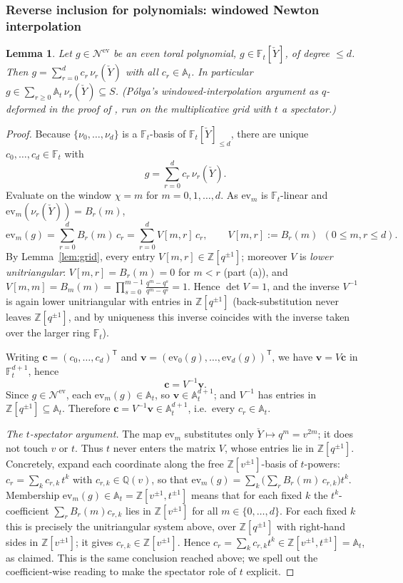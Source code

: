 \documentclass[11pt]{article}
\newtheorem{lemma}{Lemma}
\newcommand{\At}{\mathbb{A}_t}
\newcommand{\Ft}{\mathbb{F}_t}
\newcommand{\Nev}{\mathcal N^{\mathrm{ev}}}
\newcommand{\Yc}{\check Y}
\newcommand{\Z}{\mathbb Z}
\newcommand{\ev}{\mathrm{ev}}
\begin{document}
\subsubsection{Reverse inclusion for polynomials: windowed Newton interpolation}

\begin{lemma}\label{lem:rev}
Let $g\in\Nev$ be an even toral \emph{polynomial}, $g\in\Ft[\Yc]$, of degree
$\le d$. Then $g=\sum_{r=0}^{d}c_r\,\nu_r(\Yc)$ with all $c_r\in\At$. In
particular $g\in\sum_{r\ge0}\At\,\nu_r(\Yc)\subseteq S$.
(P\'olya's windowed-interpolation argument as $q$-deformed in the proof of
\cite[\S1]{HarmanHopkins}, run on the multiplicative grid with $t$ a
spectator.)
\end{lemma}

\begin{proof}
Because $\{\nu_0,\dots,\nu_d\}$ is a $\Ft$-basis of $\Ft[\Yc]_{\le d}$, there are
unique $c_0,\dots,c_d\in\Ft$ with
\[
  g=\sum_{r=0}^{d}c_r\,\nu_r(\Yc).
\]
Evaluate on the window $\chi=m$ for $m=0,1,\dots,d$. As $\ev_m$ is
$\Ft$-linear and $\ev_m(\nu_r(\Yc))=B_r(m)$,
\[
  \ev_m(g)=\sum_{r=0}^{d}B_r(m)\,c_r
  =\sum_{r=0}^{d}V[m,r]\,c_r,
  \qquad V[m,r]:=B_r(m)\ \ (0\le m,r\le d).
\]
By Lemma~\ref{lem:grid}, every entry $V[m,r]\in\Z[q^{\pm1}]$; moreover $V$ is
\emph{lower unitriangular}: $V[m,r]=B_r(m)=0$ for $m<r$ (part (a)), and
$V[m,m]=B_m(m)=\prod_{s=0}^{m-1}\frac{q^{m}-q^{s}}{q^{m}-q^{s}}=1$. Hence
$\det V=1$, and the inverse $V^{-1}$ is again lower unitriangular with entries in
$\Z[q^{\pm1}]$ (back-substitution never leaves $\Z[q^{\pm1}]$, and by uniqueness
this inverse coincides with the inverse taken over the larger ring $\Ft$).

Writing $\mathbf c=(c_0,\dots,c_d)^{\mathsf T}$ and
$\mathbf v=(\ev_0(g),\dots,\ev_d(g))^{\mathsf T}$, we have $\mathbf v=V\mathbf c$
in $\Ft^{d+1}$, hence
\[
  \mathbf c=V^{-1}\mathbf v .
\]
Since $g\in\Nev$, each $\ev_m(g)\in\At$, so $\mathbf v\in\At^{d+1}$; and
$V^{-1}$ has entries in $\Z[q^{\pm1}]\subseteq\At$. Therefore
$\mathbf c=V^{-1}\mathbf v\in\At^{d+1}$, i.e.\ every $c_r\in\At$.

\smallskip
\emph{The $t$-spectator argument.}\;
The map $\ev_m$ substitutes only $\Yc\mapsto q^{m}=v^{2m}$; it does not touch $v$
or $t$. Thus $t$ never enters the matrix $V$, whose entries lie in
$\Z[q^{\pm1}]$. Concretely, expand each coordinate along the free
$\Z[v^{\pm1}]$-basis of $t$-powers: $c_r=\sum_{k}c_{r,k}\,t^{k}$ with
$c_{r,k}\in\mathbb Q(v)$, so that
$\ev_m(g)=\sum_{k}\bigl(\sum_{r}B_r(m)\,c_{r,k}\bigr)t^{k}$. Membership
$\ev_m(g)\in\At=\Z[v^{\pm1},t^{\pm1}]$ means that for each fixed $k$ the
$t^{k}$-coefficient $\sum_r B_r(m)c_{r,k}$ lies in $\Z[v^{\pm1}]$ for all
$m\in\{0,\dots,d\}$. For each fixed $k$ this is precisely the unitriangular
system above, over $\Z[q^{\pm1}]$ with right-hand sides in $\Z[v^{\pm1}]$; it
gives $c_{r,k}\in\Z[v^{\pm1}]$. Hence
$c_r=\sum_k c_{r,k}t^{k}\in\Z[v^{\pm1},t^{\pm1}]=\At$, as claimed. This is the
same conclusion reached above; we spell out the coefficient-wise reading to make
the spectator role of $t$ explicit.


\end{proof}
\end{document}
